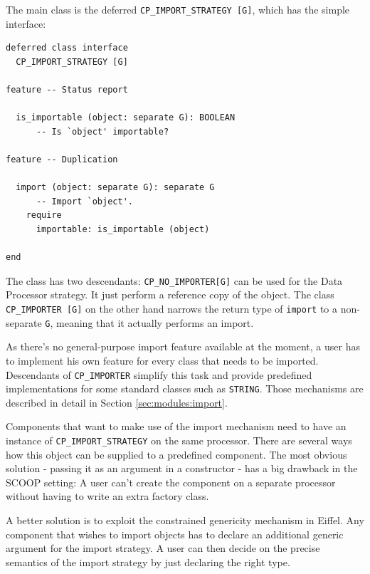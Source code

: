 \documentclass[a4paper,10pt]{article}
\begin{document}
The main class is the deferred \lstinline!CP_IMPORT_STRATEGY [G]!, which has the simple interface:

\begin{lstlisting}[language=OOSC2Eiffel, captionpos=b, caption={The deferred class CP\_IMPORT\_STRATEGY.}]
deferred class interface
  CP_IMPORT_STRATEGY [G]

feature -- Status report

  is_importable (object: separate G): BOOLEAN
      -- Is `object' importable?

feature -- Duplication

  import (object: separate G): separate G
      -- Import `object'.
    require
      importable: is_importable (object)

end
\end{lstlisting}


The class has two descendants: \lstinline!CP_NO_IMPORTER[G]! can be used for the Data Processor strategy. 
It just perform a reference copy of the object.
The class \lstinline!CP_IMPORTER [G]! on the other hand narrows the return type of \lstinline!import! to a non-separate \lstinline!G!, meaning that it actually performs an import.

As there's no general-purpose import feature available at the moment, a user has to implement his own feature for every class that needs to be imported.
Descendants of \lstinline!CP_IMPORTER! simplify this task and provide predefined implementations for some standard classes such as \lstinline!STRING!.
Those mechanisms are described in detail in Section \ref{sec:modules:import}.

Components that want to make use of the import mechanism need to have an instance of \lstinline!CP_IMPORT_STRATEGY! on the same processor.
There are several ways how this object can be supplied to a predefined component.
The most obvious solution - passing it as an argument in a constructor - has a big drawback in the SCOOP setting:
A user can't create the component on a separate processor without having to write an extra factory class.

A better solution is to exploit the constrained genericity mechanism in Eiffel.
Any component that wishes to import objects has to declare an additional generic argument for the import strategy.
A user can then decide on the precise semantics of the import strategy by just declaring the right type.
\end{document}
